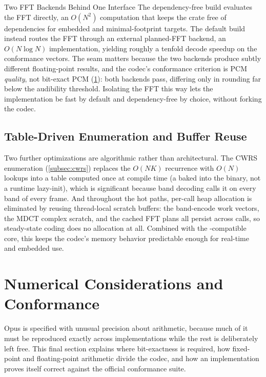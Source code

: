 \begin{concept}{Two FFT Backends Behind One Interface}
  The dependency-free build evaluates the FFT directly, an $O(N^2)$ computation
  that keeps the crate free of dependencies for embedded and minimal-footprint
  targets. The default build instead routes the FFT through an external
  planned-FFT backend, an $O(N\log N)$ implementation, yielding
  roughly a tenfold
  decode speedup on the conformance vectors. The seam matters because the two
  backends produce subtly different floating-point results, and the codec's
  conformance criterion is PCM \emph{quality}, not bit-exact PCM
  (\cref{sec:numerical}): both backends pass, differing only in
  rounding far below
  the audibility threshold. Isolating the FFT this way lets the
  implementation be
  fast by default and dependency-free by choice, without forking the codec.
\end{concept}

\subsection{Table-Driven Enumeration and Buffer Reuse}\label{subsec:tables}

Two further optimizations are algorithmic rather than architectural. The CWRS
enumeration (\cref{subsec:cwrs}) replaces the $O(NK)$ recurrence with $O(N)$
lookups into a table computed once at compile time (a  baked
into the binary, not a runtime lazy-init), which is significant because band
decoding calls it on every band of every frame. And throughout the
hot paths, per-call heap allocation is eliminated by reusing
thread-local scratch
buffers: the band-encode work vectors, the MDCT complex scratch, and the cached
FFT plans all persist across calls, so steady-state coding does no allocation at
all. Combined with the -compatible core, this keeps the codec's
memory behavior predictable enough for real-time and embedded use.

\section{Numerical Considerations and Conformance}\label{sec:numerical}

Opus is specified with unusual precision about arithmetic, because much of it
must be reproduced exactly across implementations while the rest is deliberately
left free. This final section explains where bit-exactness is required, how
fixed-point and floating-point arithmetic divide the codec, and how an
implementation proves itself correct against the official conformance suite.

